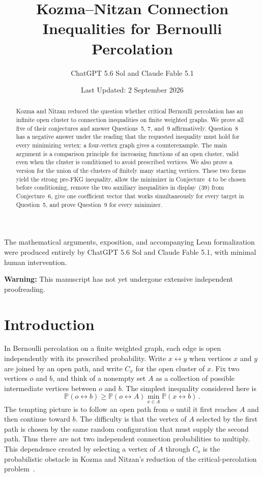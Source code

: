 \documentclass[11pt]{article}
\title{Kozma--Nitzan Connection Inequalities for Bernoulli Percolation}
\author{ChatGPT 5.6 Sol and Claude Fable 5.1}
\date{\small Last Updated: 2 September 2026}
\theoremstyle{definition}
\theoremstyle{remark}
\newcommand{\PP}{\mathbb P}
\newcommand{\con}{\leftrightarrow}
\begin{document}
\maketitle

\begin{center}
\small
The mathematical arguments, exposition, and accompanying Lean formalization were
produced entirely by ChatGPT 5.6 Sol and Claude Fable 5.1, with minimal human intervention.
\par\smallskip
\textbf{Warning:} This manuscript has not yet undergone extensive independent proofreading.
\end{center}

\begin{abstract}
Kozma and Nitzan reduced the question whether critical Bernoulli percolation has an
infinite open cluster to connection inequalities on finite weighted graphs. We prove all
five of their conjectures and answer Questions~5, 7, and~9 affirmatively. Question~8 has a
negative answer under the reading that the requested inequality must hold for every
minimizing vertex: a four-vertex graph gives a counterexample. The main argument is a
comparison principle for increasing functions of an open cluster, valid even when the
cluster is conditioned to avoid prescribed vertices. We also prove a version for the
union of the clusters of finitely many starting vertices. These two forms yield the strong
pre-FKG inequality, allow the minimizer in Conjecture~4 to be chosen before conditioning,
remove the two auxiliary inequalities in display~(39) from Conjecture~6, give one
coefficient vector that works simultaneously for every target in Question~5, and prove
Question~9 for every minimizer.
\end{abstract}

\section{Introduction}

In Bernoulli percolation on a finite weighted graph, each edge is open independently with
its prescribed probability. Write $x\con y$ when vertices $x$ and $y$ are joined by an
open path, and write $C_x$ for the open cluster of $x$. Fix two vertices $o$ and $b$, and
think of a nonempty set $A$ as a collection of possible intermediate vertices between
$o$ and $b$. The simplest inequality considered here is
\[
  \PP(o\con b)\geq \PP(o\con A)\min_{x\in A}\PP(x\con b)\,.
\]
The tempting picture is to follow an open path from $o$ until it first reaches $A$ and then continue
toward $b$. The difficulty is that the vertex of $A$ selected by the first path is chosen
by the same random configuration that must supply the second path. Thus there are not two
independent connection probabilities to multiply. This dependence created by selecting a
vertex of $A$ through $C_o$ is the probabilistic obstacle in Kozma and Nitzan's reduction
of the critical-percolation problem~\cite{KN}.
\end{document}
